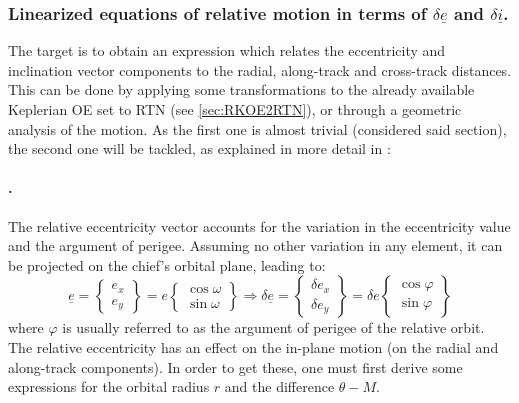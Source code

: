 		\subsubsection{Linearized equations of relative motion in terms of $\delta\underline{e}$ and $\delta\underline{i}$.}
		\indent The target is to obtain an expression which relates the eccentricity and inclination vector components to the radial, along-track and cross-track distances. This can be done by applying some transformations to the already available Keplerian OE set to RTN (see \ref{sec:RKOE2RTN}), or through a geometric analysis of the motion. As the first one is almost trivial (considered said section), the second one will be tackled, as explained in more detail in \cite{DAmico_Montenbruck}:\\
			\paragraph{ . \\}
			\indent The relative eccentricity vector accounts for the variation in the eccentricity value and the argument of perigee. Assuming no other variation in any element, it can be projected on the chief's orbital plane, leading to:
			\[
			\underline{e} = \left\{ 
			\begin{array}{c}
			 e_x \\[1.5em]
			 e_y
			\end{array}\right\} 
			 = e \left\{\begin{array}{c}
			 \cos\omega \\[1.5em]
			 \sin\omega 
			\end{array}\right\} 
			\Rightarrow
			\delta \underline{e} = 
			\left\{ 
			\begin{array}{c}
			\delta e_x \\[1.5em]
			\delta e_y
			\end{array}
			\right\} = \delta e
			\left\{ 
			\begin{array}{c}
			\cos\varphi \\[1.5em]
			\sin\varphi
			\end{array}
			\right\}
			\]
			\indent where $\varphi$ is usually referred to as the argument of perigee of the relative orbit. The relative eccentricity has an effect on the in-plane motion (\ie on the radial and along-track components). In order to get these, one must first derive some expressions for the orbital radius $r$ and the difference $\theta - M$. \\
